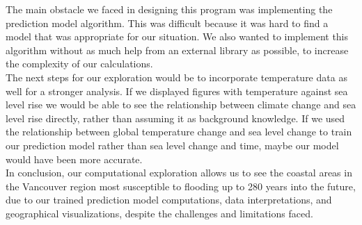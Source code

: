 \documentclass[fontsize=11pt]{article}
\begin{document}
    The main obstacle we faced in designing this program was implementing the prediction model algorithm. This was difficult because it was hard to find a model that was appropriate for our situation. We also wanted to implement this algorithm without as much help from an external library as possible, to increase the complexity of our calculations. \\

    The next steps for our exploration would be to incorporate temperature data as well for a stronger analysis. If we displayed figures with temperature against sea level rise we would be able to see the relationship between climate change and sea level rise directly, rather than assuming it as background knowledge. If we used the relationship between global temperature change and sea level change to train our prediction model rather than sea level change and time, maybe our model would have been more accurate. \\

    In conclusion, our computational exploration allows us to see the coastal areas in the Vancouver region most susceptible to flooding up to 280 years into the future, due to our trained prediction model computations, data interpretations, and geographical visualizations, despite the challenges and limitations faced.
\end{document}
